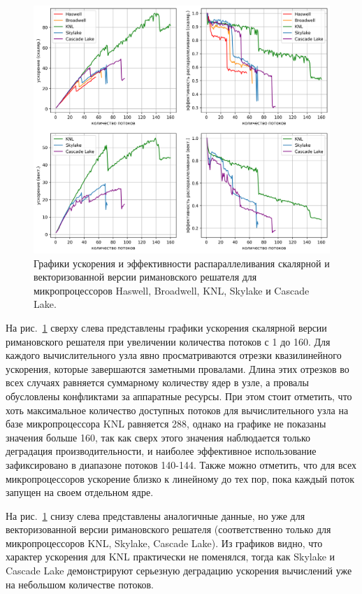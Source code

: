 \documentclass[a4paper,14pt]{extarticle}                     %
\theoremstyle{plain}                                         %
\begin{document}
\begin{figure}[ht]
\centering
\includegraphics[width=1.0\textwidth]{./pics/text_3_omp2/main_chart.png}
\singlespacing
\caption{Графики ускорения и эффективности распараллеливания скалярной и векторизованной версии римановского решателя для микропроцессоров Haswell, Broadwell, KNL, Skylake и Cascade Lake.}
\label{fig:text_3_omp2}
\end{figure}

На рис.~\ref{fig:text_3_omp2} сверху слева представлены графики ускорения скалярной версии римановского решателя при увеличении количества потоков с 1 до 160.
Для каждого вычислительного узла явно просматриваются отрезки квазилинейного ускорения, которые завершаются заметными провалами.
Длина этих отрезков во всех случаях равняется суммарному количеству ядер в узле, а провалы обусловлены конфликтами за аппаратные ресурсы.
При этом стоит отметить, что хоть максимальное количество доступных потоков для вычислительного узла на базе микропроцессора KNL равняется 288, однако на графике не показаны значения больше 160, так как сверх этого значения наблюдается только деградация производительности, и наиболее эффективное использование зафиксировано в диапазоне потоков 140-144.
Также можно отметить, что для всех микропроцессоров ускорение близко к линейному до тех пор, пока каждый поток запущен на своем отдельном ядре.

На рис.~\ref{fig:text_3_omp2} снизу слева представлены аналогичные данные, но уже для векторизованной версии римановского решателя (соответственно только для микропроцессоров KNL, Skylake, Cascade Lake).
Из графиков видно, что характер ускорения для KNL практически не поменялся, тогда как Skylake и Cascade Lake демонстрируют серьезную деградацию ускорения вычислений уже на небольшом количестве потоков.
\end{document}
